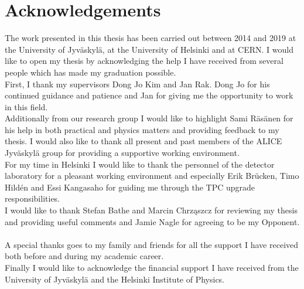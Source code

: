 \section*{Acknowledgements} 

The work presented in this thesis has been carried out between 2014 and 2019 at the University of Jyväskylä, at the University of Helsinki and at CERN. I would like to open my thesis by acknowledging the help I have received from several people which has made my graduation possible.
~\\

First, I thank my supervisors Dong Jo Kim and Jan Rak. Dong Jo for his continued guidance and patience and Jan for giving me the opportunity to work in this field.
~\\

Additionally from our research group I would like to highlight Sami Räsänen for his help in both practical and physics matters and providing feedback to my thesis. I would also like to thank all present and past members of the ALICE Jyväskylä group for providing a supportive working environment.
~\\

For my time in Helsinki I would like to thank the personnel of the detector laboratory for a pleasant working environment and especially Erik Brücken, Timo Hildén and Essi Kangasaho for guiding me through the TPC upgrade responsibilities. 
~\\

I would like to thank Stefan Bathe and Marcin Chrząszcz for reviewing my thesis and providing useful comments and Jamie Nagle for agreeing to be my Opponent.
~\\

A special thanks goes to my family and friends for all the support I have received both before and during my academic career.
~\\

Finally I would like to acknowledge the financial support I have received from the University of Jyväskylä and the Helsinki Institute of Physics.


